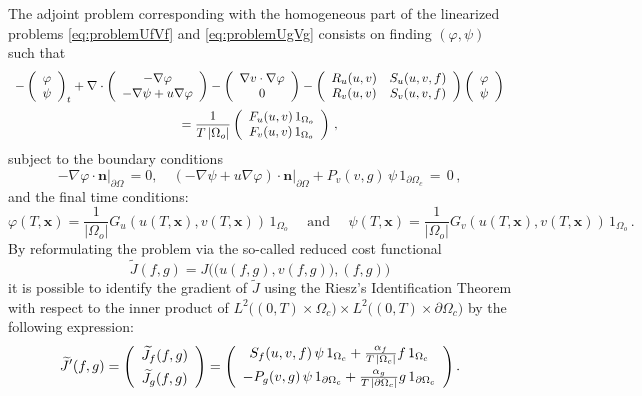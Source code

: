 \documentclass[11pt]{article}
\def \hueco{\noalign{\medskip}}
\def \beq{\begin{equation}}
\def \eeq{\end{equation}}
\def \ba{\begin{array}}
\def \ea{\end{array}}
\def \dis{\displaystyle}
\def \n{\boldsymbol{n}}
\def \x{\boldsymbol{x}}
\numberwithin{theorem}{section}
\begin{document}
The adjoint problem corresponding with the homogeneous part of the linearized problems \eqref{eq:problemUfVf} and  \eqref{eq:problemUgVg} consists on finding $(\varphi,\psi)$ such that
\beq\label{eq:AdjointPb}
\ba{c}\dis
- \left(
\begin{array}{c}
  \varphi  \\ \psi   
\end{array}
\right)_t
+ \nabla\cdot
\left(
\begin{array}{c}
   -\nabla \varphi  \\ -\nabla \psi  + u \nabla \varphi
\end{array}
\right)
- \left(
\begin{array}{c}
  \nabla v \cdot \nabla \varphi  \\ 0   
\end{array}
\right)
-
\left(
\begin{array}{cc}
  R_u(u,v) & S_u(u,v,f) \\  R_v(u,v) & S_v(u,v,f)  
\end{array}
\right)
\left(
\begin{array}{c}
  \varphi  \\ \psi   
\end{array}
\right)
\\ \hueco\dis
=
\frac{1}{T\, |\Omega_o|}\left(
\begin{array}{c}
  F_u(u,v)  \, 1_{\Omega_o} \\ F_v(u,v) \, 1_{\Omega_o}  
\end{array}
\right)\,, 
\ea
\eeq
subject to the boundary conditions
$$
-\nabla \varphi \cdot \n \big|_{\partial\Omega}
\,=0 , \quad 
(-\nabla \psi + u \nabla \varphi ) \cdot \n \big|_{\partial\Omega} + P_v(v,g) \, 
\psi \, 1_{\partial\Omega_c}\,=\,0\,,
$$
and the final time conditions:
$$
\varphi(T,\x)=\frac{1}{ |\Omega_o|}G_u(u(T,\x),v(T,\x)) \, 1_{\Omega_o}
\quad
\mbox{ and }
\quad 
\psi(T,\x)= \frac{1}{ |\Omega_o|}G_v(u(T,\x),v(T,\x))\, 1_{\Omega_o}\,. 
$$
By reformulating the problem via the so-called reduced cost functional 
$$
\widetilde J (f,g) = J\Big(\big(u(f,g),v(f,g)\big),(f,g)\Big)
$$
it is possible to identify the gradient of $\widetilde J$ using the 
Riesz's Identification Theorem  with respect to the inner product of $L^2\big((0,T)\times \Omega_c\big)\times L^2\big((0,T)\times \partial\Omega_c\big)$ by the following expression: 
$$
\widetilde J' (f,g) =
\left(
\begin{array}{c}
  \widetilde J_f (f,g)  \\
   \noalign{\vspace{-2ex}}\\
     \widetilde J_g (f,g)
\end{array}
\right)
=
\left(
\begin{array}{c}
  S_f(u,v,f) \, \psi \, 1_{\Omega_c}+  \frac{\alpha_f}{T\, |\Omega_c|}  f   \, 1_{\Omega_c}
   \\
   \noalign{\vspace{-2ex}}\\
  - P_g(v,g) \, \psi \, 1_{\partial\Omega_c} +  \frac{\alpha_g}{T\, |\partial\Omega_c|} g \, 1_{\partial\Omega_c}
\end{array}
\right) .
$$
\end{document}
